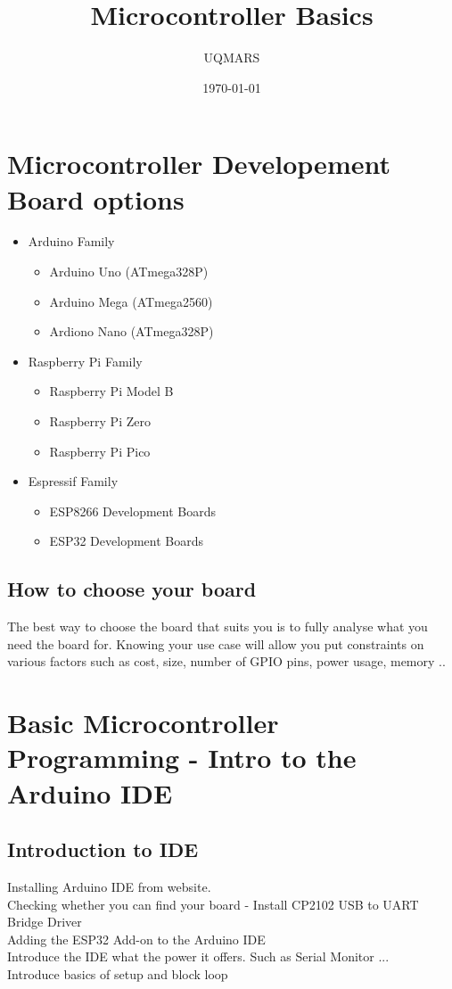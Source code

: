 \documentclass[11pt]{article}
\title{Microcontroller Basics} %
\author{UQMARS}
\date{\today}
\begin{document}
\maketitle
\pagebreak
\section*{Microcontroller Developement Board options}
\begin{itemize}
    \item Arduino Family
    \begin{itemize}
        \item Arduino Uno (ATmega328P)
        \item Arduino Mega (ATmega2560)
        \item Ardiono Nano (ATmega328P)
    \end{itemize}
    \item Raspberry Pi Family 
    \begin{itemize}
        \item Raspberry Pi Model B
        \item Raspberry Pi Zero
        \item Raspberry Pi Pico
    \end{itemize}
    \item Espressif Family
    \begin{itemize}
        \item ESP8266 Development Boards
        \item ESP32 Development Boards
    \end{itemize}
\end{itemize}

\subsection*{How to choose your board} 
The best way to choose the board that suits you is to fully analyse what you need the board for. Knowing your use case will allow you put constraints on various factors such as cost, size, number of GPIO pins, power usage, memory ..

\section*{Basic Microcontroller Programming - Intro to the Arduino IDE}

\subsection*{Introduction to IDE}
Installing Arduino IDE from website.\\
Checking whether you can find your board - Install CP2102 USB to UART Bridge Driver\\
Adding the ESP32 Add-on to the Arduino IDE\\
Introduce the IDE what the power it offers. Such as Serial Monitor ...\\
Introduce basics of setup and block loop {}\\
\end{document}
